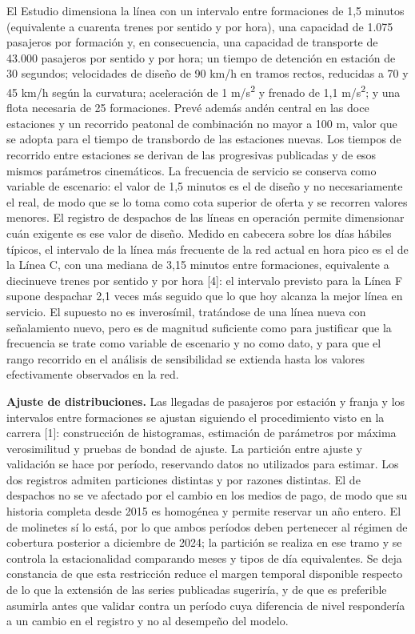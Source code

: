 \documentclass{article}
\begin{document}
El Estudio dimensiona la línea con un intervalo entre
formaciones de 1,5 minutos (equivalente a cuarenta trenes por sentido y por hora), una capacidad de
1.075 pasajeros por formación y, en consecuencia, una capacidad de transporte de 43.000 pasajeros por
sentido y por hora; un tiempo de detención en estación de 30 segundos; velocidades de diseño de 90 km/h en
tramos rectos, reducidas a 70 y 45 km/h según la curvatura; aceleración de 1 m/s\textsuperscript{2} y
frenado de 1,1 m/s\textsuperscript{2}; y una flota necesaria de 25 formaciones. Prevé además andén central
en las doce estaciones y un recorrido peatonal de combinación no mayor a 100 m, valor que se adopta para el
tiempo de transbordo de las estaciones nuevas. Los tiempos de recorrido entre estaciones se derivan de las progresivas publicadas y de esos mismos parámetros cinemáticos. La frecuencia de
servicio se conserva como variable de escenario: el valor de 1,5 minutos es el de diseño y no
necesariamente el real, de modo que se lo toma como cota superior de oferta y se recorren
valores menores. El registro de despachos de las líneas en operación permite dimensionar cuán exigente es
ese valor de diseño. Medido en cabecera sobre los días hábiles típicos, el intervalo de la línea más
frecuente de la red actual en hora pico es el de la Línea C, con una mediana de 3,15 minutos entre
formaciones, equivalente a diecinueve trenes por sentido y por hora [4]: el intervalo previsto para la
Línea F supone despachar 2,1 veces más seguido que lo que hoy alcanza la mejor línea en servicio. El
supuesto no es inverosímil, tratándose de una línea nueva con señalamiento nuevo, pero es de magnitud
suficiente como para justificar que la frecuencia se trate como variable de escenario y no como dato, y
para que el rango recorrido en el análisis de sensibilidad se extienda hasta los valores efectivamente
observados en la red.

\textbf{Ajuste de distribuciones.} Las llegadas de pasajeros por estación y franja y los intervalos entre
formaciones se ajustan siguiendo el procedimiento visto en la carrera [1]: construcción de histogramas,
estimación de parámetros por máxima verosimilitud y pruebas de bondad de ajuste. La partición entre ajuste y
validación se hace por período, reservando datos no utilizados para estimar. Los dos registros admiten
particiones distintas y por razones distintas. El de despachos no se ve afectado por el cambio en los medios
de pago, de modo que su historia completa desde 2015 es homogénea y permite reservar un año entero. El de
molinetes sí lo está, por lo que ambos períodos deben pertenecer al régimen de cobertura posterior a
diciembre de 2024; la partición se realiza en ese tramo y se controla la estacionalidad comparando meses y
tipos de día equivalentes. Se deja constancia de que esta restricción reduce el margen temporal disponible
respecto de lo que la extensión de las series publicadas sugeriría, y de que es preferible asumirla antes
que validar contra un período cuya diferencia de nivel respondería a un cambio en el registro y no al
desempeño del modelo.
\end{document}

